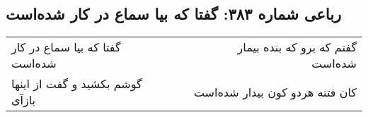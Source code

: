 \begin{center}
\section*{رباعی شماره ۳۸۳: گفتا که بیا سماع در کار شده‌است}
\label{sec:0383}
\begin{longtable}{l p{0.5cm} r}
گفتا که بیا سماع در کار شده‌است
&&
گفتم که برو که بنده بیمار شده‌است
\\
گوشم بکشید و گفت از اینها بازآی
&&
کان فتنه هردو کون بیدار شده‌است
\\
\end{longtable}
\end{center}
